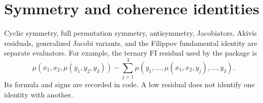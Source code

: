 \section{Symmetry and coherence identities}

Cyclic symmetry, full permutation symmetry, antisymmetry, Jacobiators, Akivis residuals, generalized Jacobi variants, and the Filippov fundamental identity are separate evaluators. For example, the ternary FI residual used by the package is
\[
\mu(x_1,x_2,\mu(y_1,y_2,y_3))-\sum_{j=1}^3\mu(y_1,\ldots,\mu(x_1,x_2,y_j),\ldots,y_3).
\]
Its formula and signs are recorded in code. A low residual does not identify one identity with another.



